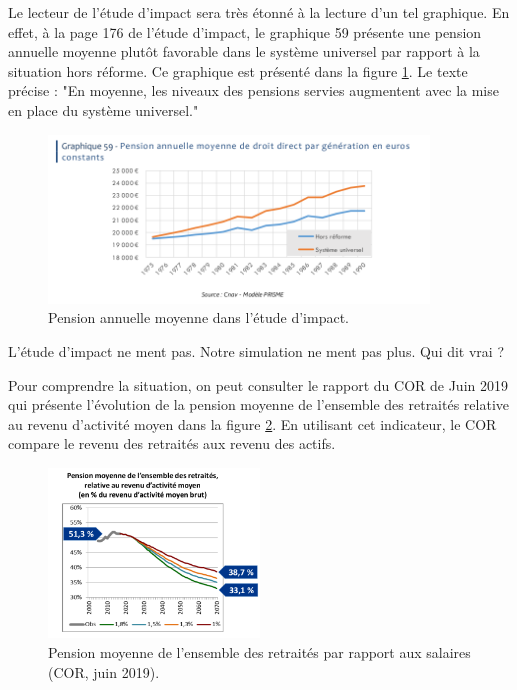 \documentclass[10pt]{article}
\begin{document}
Le lecteur de l'étude d'impact sera très étonné à la lecture d'un 
tel graphique. 
En effet, à la page 176 de l'étude d'impact, le graphique 59 présente 
une pension annuelle moyenne plutôt favorable dans le système 
universel par rapport à la situation hors réforme. 
Ce graphique est présenté dans la figure \ref{fig-pension-annuelle-etude-impact}. 
Le texte précise : "En moyenne, les niveaux des pensions servies augmentent 
avec la mise en place du système universel."


\begin{figure}
\begin{center}
\includegraphics[width=0.9\textwidth]{EtudeImpact-PensionAnnuelle.png}
\end{center}

\caption{Pension annuelle moyenne dans l'étude d'impact.}
\label{fig-pension-annuelle-etude-impact}
\end{figure}


L'étude d'impact ne ment pas. 
Notre simulation ne ment pas plus. 
Qui dit vrai ?

Pour comprendre la situation, on peut consulter le rapport du COR de Juin 2019 qui 
présente l'évolution de la pension moyenne de l'ensemble des retraités relative 
au revenu d'activité moyen dans la figure \ref{fig-pension-COR}.
En utilisant cet indicateur, le COR compare le revenu des retraités aux revenu des 
actifs. 

\begin{figure}
\begin{center}
\includegraphics[width=0.5\textwidth]{COR-Juin-2019-P.png}
\end{center}

\caption{Pension moyenne de l'ensemble des retraités par rapport aux salaires 
(COR, juin 2019).}
\label{fig-pension-COR}
\end{figure}
\end{document}
